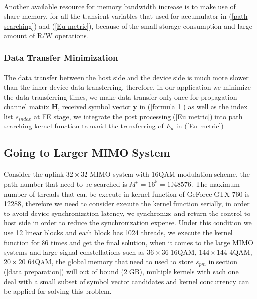 \documentclass[12pt,a4paper,final]{article}
\begin{document}
\begin{spacing}{2.5}
 \paragraph{}Another available resource for memory bandwidth increase is to make use of share memory, for all the transient variables that used for accumulator in (\ref{path searching}) and (\ref{Eu metric}), because of the small storage consumption and large amount of R/W operations.   
\subsubsection{Data Transfer Minimization}   
\paragraph{}The data transfer between the host side and the device side is much more slower than the inner device data transferring, therefore, in our application we minimize the data transferring times, we make data transfer only once for propagation channel matrix $\mathbf{H}$, received symbol vector $\mathbf{y}$ in (\ref{formula 1}) as well as the index list $\mathit{s_{index}}$ at FE stage, we integrate the post processing (\ref{Eu metric}) into path searching kernel function to avoid the transferring of $E_{u}$ in (\ref{Eu metric}).  
\subsection{Going to Larger MIMO System}
  \paragraph{}Consider the uplink $32\times 32$ MIMO system with $16$QAM modulation scheme, the path number that need to be searched is $M^{\rho}=16^{5}=1048576$. The maximum number of threads that can be execute in kernel function of GeForce GTX 760 is 12288, therefore we need to consider execute the kernel function serially, in order to avoid device synchronization latency, we synchronize and return the control to host side in order to reduce the synchronization expense. Under this condition we use 12 linear blocks and each block has 1024 threads, we execute the kernel function for 86 times and get the final solution,  when it comes to the large MIMO systems and large signal constellations such as $36\times 36$ $16$QAM, $144\times 144$ $4$QAM, $20\times 20$ $64$QAM, the global memory that need to used to store $s_{pm}$ in section (\ref{data preparation}) will out of bound (2 GB), multiple kernels with each one deal with a small subset of symbol vector candidates and kernel concurrency\cite{nvidia2008programming} can be applied for solving this problem.

\end{spacing}
\end{document}
